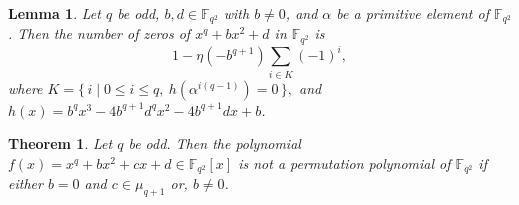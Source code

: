 \documentclass[10pt,a4paper]{amsart}
\newtheorem{lemma}{Lemma}
\newtheorem{theorem}{Theorem}
\begin{document}
\begin{lemma}\label{l6}
Let $q$ be odd, $b,d \in \mathbb{F}_{q^2}$ with $b \neq 0$, and $\alpha$ be a primitive element of $\mathbb{F}_{q^2}$. Then the number of zeros of
$x^q+bx^2+d$ in $\mathbb{F}_{q^2}$ is
$$
1-\eta(-b^{q+1}) \sum_{i \in K} (-1)^i,
$$
where
$K=\{\, i \mid 0 \leq i \leq q,\ h(\alpha^{i(q-1)})=0 \,\},
$ and $h(x)=b^q x^3-4b^{q+1}d^q x^2-4b^{q+1}d x+b$.

\end{lemma}

\begin{theorem}\label{t1}
Let $q$ be odd. Then the polynomial
$f(x)=x^q+bx^2+cx+d\in\mathbb{F}_{q^2}[x]$ is not a permutation polynomial of $\mathbb{F}_{q^2}$ if either $b=0$ and $c\in\mu_{q+1}$ or, $b\neq0$.
\end{theorem}
\end{document}
